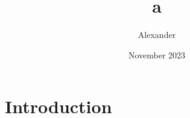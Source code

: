 \documentclass{article}
\title{a}
\author{Alexander }
\date{November 2023}
\begin{document}
\maketitle

\section{Introduction}
\end{document}
